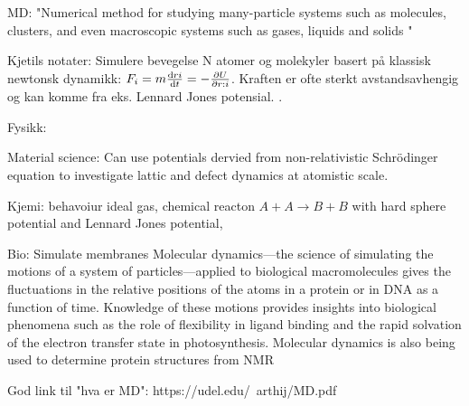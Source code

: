 MD: 
"Numerical method for studying many-particle systems
such as molecules, clusters, and even macroscopic
systems such as gases, liquids and solids "


Kjetils notater:
Simulere bevegelse N atomer og molekyler basert på klassisk newtonsk dynamikk: $ F_i = m\dv{ri}{t}  = - \pdv{U}{r:i}$. Kraften er ofte sterkt avstandsavhengig og kan komme fra eks. Lennard Jones potensial.  \cite{article_A_Hands-On_Introduction_to_Molecular_Dynamics}.


Fysikk:

Material science:
	Can use potentials dervied from non-relativistic Schrödinger equation to investigate lattic and defect dynamics at atomistic scale. \cite{materialphysics}

Kjemi:
	behavoiur ideal gas, chemical reacton $ A + A \rightarrow B+B $ with hard sphere potential and Lennard Jones potential, \cite{GORECKI1989245}
	
Bio:
	Simulate membranes
Molecular dynamics—the science of simulating the motions of a system of particles—applied to biological macromolecules gives the fluctuations in the relative positions of the atoms in a protein or in DNA as a function of time. Knowledge of these motions provides insights into biological phenomena such as the role of flexibility in ligand binding and the rapid solvation of the electron transfer state in photosynthesis. Molecular dynamics is also being used to determine protein structures from NMR \cite{biology}

God link til "hva er MD": https://udel.edu/~arthij/MD.pdf